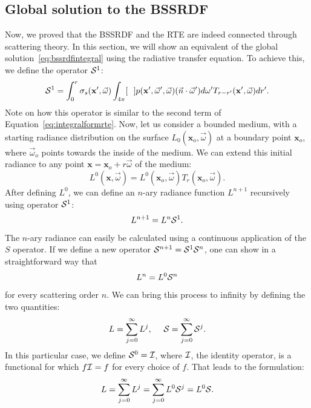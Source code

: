 \subsection{Global solution to the BSSRDF}
Now, we proved that the BSSRDF and the RTE are indeed connected through scattering theory. In this section, we will show an equivalent of the global solution~\ref{eq:bssrdfintegral} using the radiative transfer equation. To achieve this, we define the operator $\mathcal{S}^1$:
\begin{equation*}
\mathcal{S}^1 = \int_0^r \sigma_s(\mathbf{x}', \vec{\omega}) \int_{4\pi} [\ \ ] p(\mathbf{x}', \vec{\omega}', \vec{\omega})  (\vec{n} \cdot \vec{\omega}')  d\omega' T_{r-r'}(\mathbf{x}', \vec{\omega})  dr'.
\end{equation*}
Note on how this operator is similar to the second term of Equation~\ref{eq:integralformrte}. Now, let us consider a bounded medium, with a starting radiance distribution on the surface $L_0(\mathbf{x}_o, \vec{\omega})$ at a boundary point $\mathbf{x}_o$, where $\vec{\omega}_o$ points towards the inside of the medium. We can extend this initial radiance to any point $\mathbf{x} = \mathbf{x}_o + r \vec{\omega}$ of the medium:
\begin{equation*}
L^0(\mathbf{x}, \vec{\omega}) = L^0(\mathbf{x}_o, \vec{\omega}) T_r(\mathbf{x}_o, \vec{\omega}).
\end{equation*}
After defining $L^0$, we can define an $n$-ary radiance function $L^{n+1}$ recursively using operator $\mathcal{S}^1$:
\begin{equation*}
L^{n+1} = L^n \mathcal{S}^1.
\end{equation*}
The $n$-ary radiance can easily be calculated using a continuous application of the $S$ operator. If we define a new operator $\mathcal{S}^{n+1} = \mathcal{S}^1 \mathcal{S}^n$, one can show in a straightforward way that 
\begin{equation*}
L^n = L^0 \mathcal{S}^n
\end{equation*}
for every scattering order $n$.
We can bring this process to infinity by defining the two quantities:
\begin{equation*}
L = \sum_{j=0}^\infty L^j,\ \ \ \ \operator{S} = \sum_{j=0}^\infty \operator{S}^j.
\end{equation*}
In this particular case, we define $\mathcal{S}^0 = \mathcal{I}$, where $\mathcal{I}$, the identity operator, is a functional for which $f \mathcal{I} = f$ for every choice of $f$.
That leads to the formulation:
\begin{equation}
\label{eq:funcform}
L =  \sum_{j=0}^\infty L^j = \sum_{j=0}^\infty L^0 \mathcal{S}^j = L^0 \mathcal{S}.
\end{equation}
